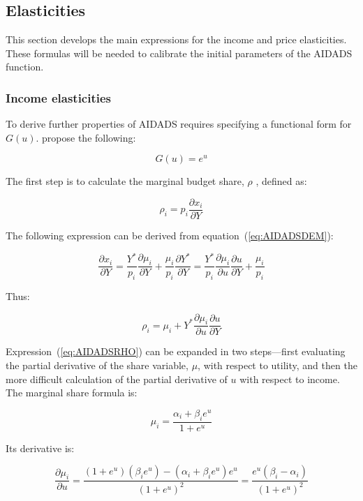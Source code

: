\subsection{Elasticities}

This section develops the main expressions for the income and price elasticities.
These formulas will be needed to calibrate the initial parameters of the AIDADS function.

\subsubsection{Income elasticities}

To derive further properties of AIDADS requires specifying a functional form for $G(u)$.
\cite{RimmerPowell1996} propose the following:


\begin{equation}
\label{eq:AIDADSG}
G(u) = {e^u}
\end{equation}

The first step is to calculate the marginal budget share, $\rho$ , defined as:

\[{\rho _i} = {p_i}\frac{{\partial {x_i}}}{{\partial Y}}\]

The following expression can be derived from equation~(\ref{eq:AIDADSDEM}):

\[\frac{{\partial {x_i}}}{{\partial Y}} =
   \frac{{{Y^*}}}{{{p_i}}}\frac{{\partial {\mu _i}}}{{\partial Y}} +
   \frac{{{\mu _i}}}{{{p_i}}}\frac{{\partial {Y^*}}}{{\partial Y}} =
   \frac{{{Y^*}}}{{{p_i}}}\frac{{\partial {\mu _i}}}{{\partial u}}\frac{{\partial u}}{{\partial Y}}
   + \frac{{{\mu _i}}}{{{p_i}}}
\]

\noindent Thus:

\begin{equation}
\label{eq:AIDADSRHO}
\rho_i = \mu_i + {Y^*}\frac{{\partial {\mu _i}}}{{\partial u}}\frac{{\partial u}}{{\partial Y}}
\end{equation}

Expression~(\ref{eq:AIDADSRHO}) can be expanded in two steps---first evaluating the partial
derivative of the share variable, $\mu$, with respect to utility, and then the more difficult
calculation of the partial derivative of $u$ with respect to income. The marginal share formula is:

\[{\mu _i} = \frac{{{\alpha _i} + {\beta _i}{e^u}}}{{1 + {e^u}}}\]

\noindent Its derivative is:

\begin{equation}
\label{eq:AIDADSDMU}
\frac{{\partial {\mu _i}}}{{\partial u}} = \frac{{\left( {1 + {e^u}} \right)
   \left( {{\beta _i}{e^u}} \right) - \left( {{\alpha _i} + {\beta _i}{e^u}} \right)
   {e^u}}}{{{{(1 + {e^u})}^2}}} = \frac{{{e^u}\left( {{\beta _i} - {\alpha _i}} \right)}}
{{{{(1 + {e^u})}^2}}}
\end{equation}

